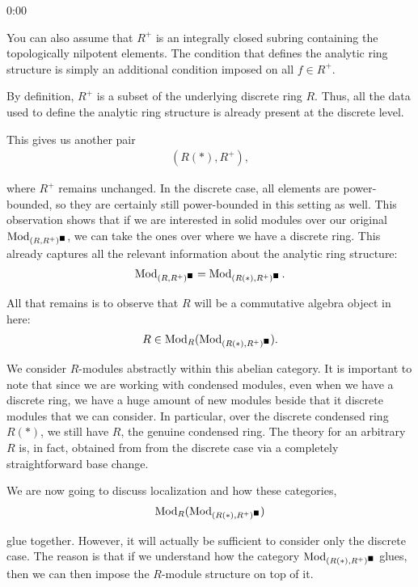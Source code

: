 \begin{unfinished}{0:00}
\begin{remark}
You can also assume that $R^+$ is an integrally closed subring containing the topologically nilpotent elements. The condition that defines the analytic ring structure is simply an additional condition imposed on all $f \in R^+$. 

By definition, $R^+$ is a subset of the underlying discrete ring $R$. Thus, all the data used to define the analytic ring structure is already present at the discrete level. 

This gives us another pair
\begin{align*}
(R(\ast), R^+),
\end{align*}

where $R^+$ remains unchanged. In the discrete case, all elements are power-bounded, so they are certainly still power-bounded in this setting as well.
This observation shows that if we are interested in solid modules over our original $\operatorname{Mod}_{(R,R^+)^\blacksquare}$, we can take the ones over where we have a discrete ring. This already captures all  the relevant information about the analytic ring structure:
\begin{align*}
\operatorname{Mod}_{(R,R^+)^\blacksquare} = \operatorname{Mod}_{(R(\ast),R^+)^\blacksquare}.
\end{align*}

All that remains is to observe that $R$ will be a commutative algebra object in here:
\begin{align*}
R \in \operatorname{Mod}_R (\operatorname{Mod}_{(R(\ast),R^+)^\blacksquare}).
\end{align*}

We consider $R$-modules abstractly within this abelian category. 
It is important to note that since we are working with condensed modules, even when we have a discrete ring, we have a huge amount of new modules beside that it discrete modules that we can consider.
In particular, over the discrete condensed ring $R(\ast)$, we still have $R$, the genuine condensed ring. The theory for an arbitrary $R$ is, in fact, obtained from from the discrete case via a completely straightforward base change.

\end{remark}

We are now going to discuss localization and how these categories,
\begin{align*}
\operatorname{Mod}_R (\operatorname{Mod}_{(R(\ast),R^+)^\blacksquare})
\end{align*} 

glue together. However, it will actually be sufficient to consider only the discrete case.
The reason is that if we understand how the category $\operatorname{Mod}_{(R(\ast),R^+)^\blacksquare}$ glues, then we can then impose the $R$-module structure on top of it.


\end{unfinished}
